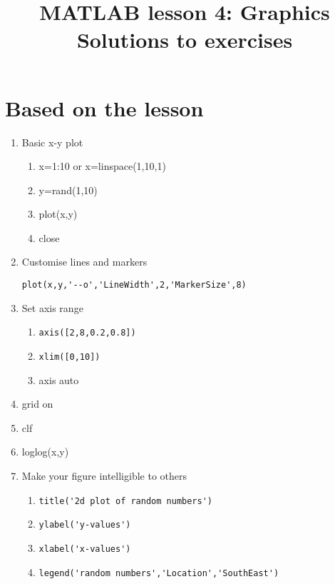 \documentclass[a4paper]{article}
\title{MATLAB lesson 4: Graphics\\Solutions to exercises}
\date{}
\begin{document}
\maketitle


\section{Based on the lesson}

\begin{enumerate}
	\item Basic x-y plot
	\begin{enumerate}
		\item x=1:10 or x=linspace(1,10,1)
		\item y=rand(1,10)
		\item plot(x,y)
		\item close
	\end{enumerate}
	
	\item Customise lines and markers
	
	\lstinline[style=Matlab-editor]!plot(x,y,'--o','LineWidth',2,'MarkerSize',8)!
	
	\item Set axis range
	\begin{enumerate}
	
		\item \lstinline[style=Matlab-editor]!axis([2,8,0.2,0.8])!
		\item \lstinline[style=Matlab-editor]!xlim([0,10])!
		\item axis auto
	\end{enumerate}
	
	\item grid on
	\item clf
	\item loglog(x,y)
	
	\item Make your figure intelligible to others
	\begin{enumerate}
		\item 	\lstinline[style=Matlab-editor]!title('2d plot of random numbers')!
		\item 	\lstinline[style=Matlab-editor]!ylabel('y-values')!
		\item 	\lstinline[style=Matlab-editor]!xlabel('x-values')!
		\item 	\lstinline[style=Matlab-editor]!legend('random numbers','Location','SouthEast')!
	\end{enumerate}
	

\end{enumerate}
\end{document}

